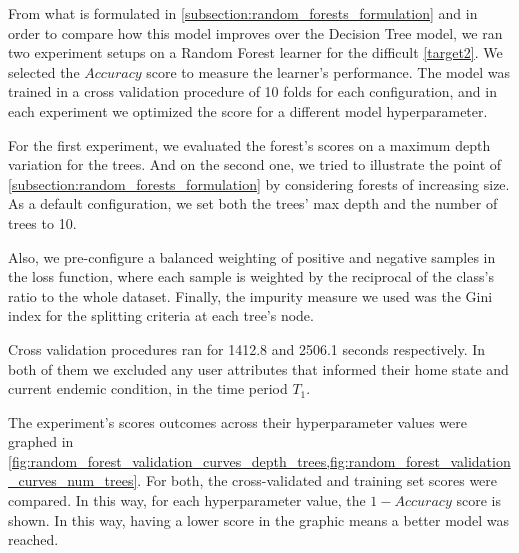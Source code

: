 From what is formulated in \cref{subsection:random_forests_formulation} and in order to compare how this model improves over the Decision Tree model, we ran two experiment setups on a Random Forest learner for the difficult  \cref{target2}.
We selected the $Accuracy$ score to measure the learner's performance.
The model was trained in a cross validation procedure of 10 folds for each configuration, and in each experiment we optimized the score for a different model hyperparameter.

For the first experiment, we evaluated the forest's scores on a maximum depth variation for the trees.
And on the second one, we tried to illustrate the point of \cref{subsection:random_forests_formulation} by considering forests of increasing size.
As a default configuration, we set both the trees' max depth and the number of trees to 10.

Also, we pre-configure a balanced weighting of positive and negative samples in the loss function, where each sample is weighted by the reciprocal of the class's ratio to the whole dataset.
Finally, the impurity measure we used was the Gini index for the splitting criteria at each tree's node.

Cross validation procedures ran for 1412.8 and 2506.1 seconds respectively.
In both of them we excluded any user attributes that informed their home state and current endemic condition, in the time period $T_1$.

The experiment's scores outcomes across their hyperparameter values were graphed in \cref{fig:random_forest_validation_curves_depth_trees,fig:random_forest_validation_curves_num_trees}.
For both, the cross-validated and training set scores were compared. In this way, for each hyperparameter value, the $1-Accuracy$ score is shown.
In this way, having a lower score in the graphic means a better model was reached.

